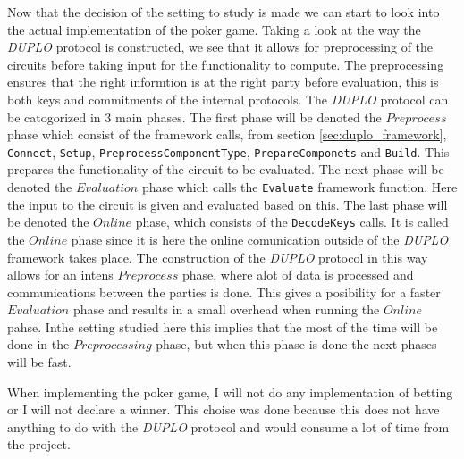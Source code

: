 \documentclass[twoside,11pt,openright]{report}
\newcommand{\DUPLO}{\textit{DUPLO} }
\begin{document}
Now that the decision of the setting to study is made we can start to look into the actual implementation of the poker game. Taking a look at the way the \DUPLO protocol is constructed, we see that it allows for preprocessing of the circuits before taking input for the functionality to compute. The preprocessing ensures that the right informtion is at the right party before evaluation, this is both keys and commitments of the internal protocols. The \DUPLO protocol can be catogorized in $3$ main phases. The first phase will be denoted the $Preprocess$ phase which consist of the framework calls, from section \ref{sec:duplo_framework}, \verb|Connect|, \verb|Setup|, \verb|PreprocessComponentType|, \verb|PrepareComponets| and \verb|Build|. This prepares the functionality of the circuit to be evaluated. The next phase will be denoted the $Evaluation$ phase which calls the \verb|Evaluate| framework function. Here the input to the circuit is given and evaluated based on this. The last phase will be denoted the $Online$ phase, which consists of the \verb|DecodeKeys| calls. It is called the $Online$ phase since it is here the online comunication outside of the \DUPLO framework takes place. The construction of the \DUPLO protocol in this way allows for an intens $Preprocess$ phase, where alot of data is processed and communications between the parties is done. This gives a posibility for a faster $Evaluation$ phase and results in a small overhead when running the $Online$ pahse. Inthe setting studied here this implies that the most of the time will be done in the $Preprocessing$ phase, but when this phase is done the next phases will be fast.

When implementing the poker game, I will not do any implementation of betting or I will not declare a winner. This choise was done because this does not have anything to do with the \DUPLO protocol and would consume a lot of time from the project.

\bigskip
\end{document}
